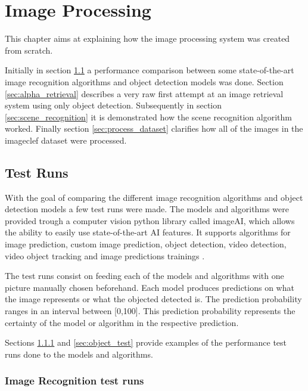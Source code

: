 \cleardoublepage

\chapter{Image Processing}
\label{ch:initial_work}

\par This chapter aims at explaining how the image processing system was created from scratch.

\par Initially in section \ref{sec:testruns} a performance comparison between some state-of-the-art image recognition algorithms and object detection models was done. Section \ref{sec:alpha_retrieval} describes a very raw first attempt at an image retrieval system using only object detection. Subsequently in section \ref{sec:scene_recognition} it is demonstrated how the scene recognition algorithm worked. Finally section \ref{sec:process_dataset} clarifies how all of the images in the imageclef dataset were processed.



  \section{Test Runs}
  \label{sec:testruns}

   With the goal of comparing the different image recognition algorithms and object detection models a few test runs were made.  The models and algorithms were provided trough a computer vision python library called imageAI, which allows the ability to easily use state-of-the-art AI features. It supports algorithms for image prediction, custom image prediction, object detection, video detection, video object tracking and image predictions trainings \cite{ImageAI}.

  The test runs consist on feeding each of the models and algorithms with one picture manually chosen beforehand. Each model produces predictions on what the image represents or what the objected detected is. The prediction probability ranges in an interval between [0,100]. This prediction probability represents the certainty of the model or algorithm in the respective prediction.


  \par Sections \ref{sec:image_test} and \ref{sec:object_test} provide examples of the performance test runs done to the models and algorithms.

  \subsection{Image Recognition test runs}
  \label{sec:image_test}


